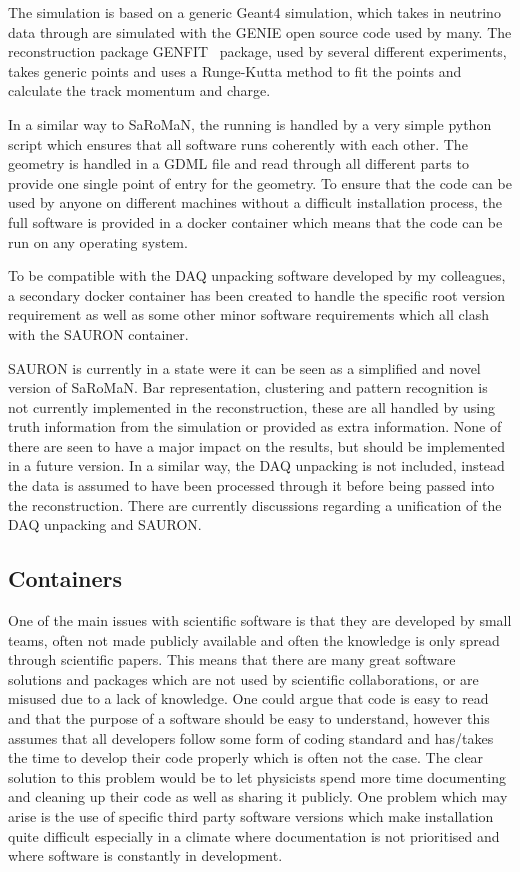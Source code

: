 The simulation is based on a generic Geant4 simulation, which takes in neutrino data through  are simulated with the GENIE open source code used by many. The reconstruction package  GENFIT~\cite{81Genfit} package, used by several different experiments, takes generic points and uses a Runge-Kutta method to fit the points and calculate the track momentum and charge.

In a similar way to SaRoMaN, the running is handled by a very simple python script which ensures that all software runs coherently with each other. The geometry is handled in a GDML file and read through all different parts to provide one single point of entry for the geometry. To ensure that the code can be used by anyone on different machines without a difficult installation process, the full software is provided in a docker container which means that the code can be run on any operating system. 

To be compatible with the DAQ unpacking software developed by my colleagues, a secondary docker container has been created to handle the specific root version requirement as well as some other minor software requirements which all clash with the SAURON container.

SAURON is currently in a state were it can be seen as a simplified and novel version of SaRoMaN. Bar representation, clustering and pattern recognition is not currently implemented in the reconstruction, these are all handled by using truth information from the simulation or provided as extra information. None of there are seen to have a major impact on the results, but should be implemented in a future version. In a similar way, the DAQ unpacking is not included, instead the data is assumed to have been processed through it before being passed into the reconstruction. There are currently discussions regarding a unification of the DAQ unpacking and SAURON.

\subsection{Containers}
One of the main issues with scientific software is that they are developed by small teams, often not made publicly available and often the knowledge is only spread through scientific papers. This means that there are many great software solutions and packages which are not used by scientific collaborations, or are misused due to a lack of knowledge. One could argue that code is easy to read and that the purpose of a software should be easy to understand, however this assumes that all developers follow some form of coding standard and has/takes the time to develop their code properly which is often not the case. The clear solution to this problem would be to let physicists spend more time documenting and cleaning up their code as well as sharing it publicly. One problem which may arise is the use of specific third party software versions which make installation quite difficult especially in a climate where documentation is not prioritised and where software is constantly in development.

